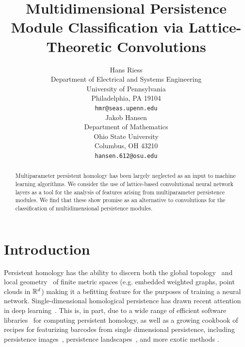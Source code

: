 \documentclass{article}
\title{Multidimensional Persistence Module Classification via Lattice-Theoretic Convolutions}
\author{%
  Hans Riess  \\
  Department of Electrical and Systems Engineering \\
  University of Pennsylvania\\
  Philadelphia, PA 19104 \\
  \texttt{hmr@seas.upenn.edu} \\
  \And
  Jakob Hansen \\
  Department of Mathematics \\
  Ohio State University \\
  Columbus, OH 43210 \\
  \texttt{hansen.612@osu.edu}
}
\begin{document}
\maketitle

\begin{abstract}
 Multiparameter persistent homology has been largely neglected as an input to
 machine learning algorithms.
 We consider the use of lattice-based convolutional neural network layers as a 
 tool for the analysis of features arising from multiparameter persistence
 modules. We find that these show promise as an alternative to convolutions for
 the classification of multidimensional persistence modules.
\end{abstract}

\section{Introduction}

Persistent homology has the ability to discern both the global
topology~\cite{ghrist_barcodes:_2008} and local
geometry~\cite{bubenik_persistent_2020} of finite metric spaces (e.g. embedded
weighted graphs, point clouds in $\mathbb{R}^d$) making it a befitting feature for the
purposes of training a neural network. Single-dimensional homological
persistence has drawn recent attention in deep learning~\cite{hofer_deep_2017,
pun_persistent-homology-based_2018, bruel-gabrielsson_topology_2020}. This is,
in part, due to a wide range of efficient software
libraries~\cite{otter_roadmap_2017, henselman_matroid_2017, bauer_ripser:_2019}
for computing persistent homology, %
as well as a growing cookbook of recipes 
for featurizing barcodes from single dimensional persistence, including
persistence images~\cite{adams_persistence_2017}, persistence
landscapes~\cite{bubenik_statistical_2015}, and more exotic methods
\cite{kalisnik_tropical_2019}.
\end{document}
